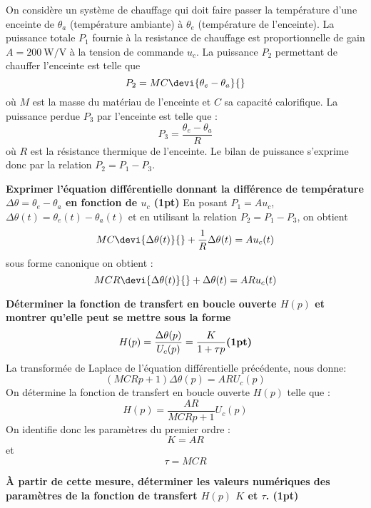 On considère un système de chauffage qui doit faire passer la température 
d'une enceinte de $\theta_a$  (température ambiante) à $\theta_e$ (température de
l'enceinte). 
La puissance totale $P_1$ fournie à la resistance de chauffage 
est proportionnelle de gain $A=\SI{200}{\watt\per\volt}$ à la tension de commande $u_c$. 
La puissance $P_2$ permettant de chauffer l'enceinte est telle que 
\[
    P_2=MC\devi{\theta_e-\theta_a}{}
\]
où $M$ est la masse du matériau de l'enceinte et $C$ sa capacité calorifique.
La puissance perdue $P_3$ par l'enceinte est telle que :
\[
    P_3=\dfrac{\theta_e-\theta_a}{R}
\]
où $R$ est la résistance thermique de l'enceinte.
Le bilan de puissance s'exprime donc par la relation $P_2=P_1-P_3$.

\question{}
\textbf{Exprimer l'équation différentielle donnant la différence de température 
$\Delta\theta=\theta_e-\theta_a$ en fonction de $u_c$
\textbf{(1pt)}}
En posant $P_1=Au_c$, $\Delta\theta(t)=\theta_e(t)-\theta_a(t)$ et en utilisant
la relation $P_2=P_1-P_3$, on obtient 
\[
    MC\devi{\Delta\theta(t)}{}+\dfrac{1}{R}\Delta\theta(t)=Au_c(t)
\]
sous forme canonique on obtient :
\[
    MCR\devi{\Delta\theta(t)}{}+\Delta\theta(t)=ARu_c(t)
\]

\question{}
\textbf{Déterminer la fonction de transfert en boucle ouverte $H(p)$ et montrer qu'elle
peut se mettre sous la forme
\[
    H(p)=\dfrac{\Delta\theta(p)}{U_c(p)}=\dfrac{K}{1+\tau p}\text{\textbf{(1pt)}}
\]}
La transformée de Laplace de l'équation différentielle précédente, nous donne:
\[
    (MCRp+1)\Delta\theta(p)=AR U_c(p)
\]
On détermine la fonction de transfert en boucle ouverte $H(p)$ telle que :
\[
    H(p)=\dfrac{AR}{MCRp+1} U_c(p)
\]
On identifie donc les paramètres du premier ordre :
\[
    K=AR
\]
et
\[
    \tau=MCR
\]

\question{}
\textbf{À partir de cette mesure, déterminer les valeurs numériques des paramètres 
de la fonction de transfert $H(p)$ $K$ et $\tau$.
\textbf{(1pt)}}

